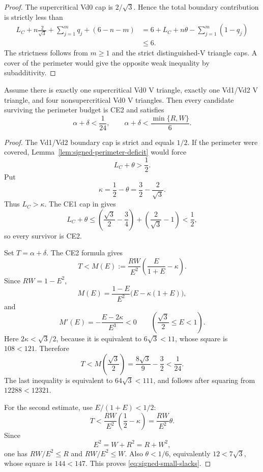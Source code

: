 \begin{proof}
The supercritical Vd0 cap is $2/\sqrt3$. Hence the total boundary contribution
is strictly less than
\[
 \begin{aligned}
 L_C+n\frac2{\sqrt3}+\sum_{j=1}^m q_j+(6-n-m)
 &=6+L_C+n\theta-\sum_{j=1}^m(1-q_j)\\
 &\le6.
 \end{aligned}
\]
The strictness follows from $m\ge1$ and the strict distinguished-V triangle caps. A
cover of the perimeter would give the opposite weak inequality by
subadditivity.
\end{proof}

\begin{lemma}
\label{lem:signed-small-slack}
Assume there is exactly one supercritical Vd0 V triangle, exactly one Vd1/Vd2 V triangle,
and four nonsupercritical Vd0 V triangles. Then every candidate surviving the
perimeter budget is CE2 and satisfies
\begin{equation}
 \boxed{
 \alpha+\delta<\frac1{24},
 \qquad
 \alpha+\delta<\frac{\min\{R,W\}}6.}
 \label{eq:signed-small-slacks}
\end{equation}
\end{lemma}

\begin{proof}
The Vd1/Vd2 boundary cap is strict and equals $1/2$. If the perimeter were
covered, Lemma~\ref{lem:signed-perimeter-deficit} would force
\[
 L_C+\theta>\frac12.
\]
Put
\[
 \kappa=\frac12-\theta=\frac32-\frac2{\sqrt3}.
\]
Thus $L_C>\kappa$. The CE1 cap in
 gives
\[
 L_C+\theta
 \le\left(\frac{\sqrt3}{2}-\frac34\right)
   +\left(\frac2{\sqrt3}-1\right)
 <\frac12,
\]
so every survivor is CE2.

Set $T=\alpha+\delta$. The CE2 formula gives
\[
 T<M(E):=
 \frac{RW}{E^2}\left(\frac{E}{1+E}-\kappa\right).
\]
Since $RW=1-E^2$,
\[
 M(E)=\frac{1-E}{E^2}\bigl(E-\kappa(1+E)\bigr),
\]
and
\[
 M'(E)=-\frac{E-2\kappa}{E^3}<0
 \qquad\left(\frac{\sqrt3}{2}\le E<1\right).
\]
Here $2\kappa<\sqrt3/2$, because it is equivalent to
$6\sqrt3<11$, whose square is $108<121$. Therefore
\[
 T<M\left(\frac{\sqrt3}{2}\right)
 =\frac{8\sqrt3}{9}-\frac32<\frac1{24}.
\]
The last inequality is equivalent to $64\sqrt3<111$, and follows after
squaring from $12288<12321$.

For the second estimate, use $E/(1+E)<1/2$:
\[
 T<\frac{RW}{E^2}\left(\frac12-\kappa\right)
   =\frac{RW}{E^2}\theta.
\]
Since
\[
 E^2=W+R^2=R+W^2,
\]
one has $RW/E^2\le R$ and $RW/E^2\le W$. Also
$\theta<1/6$, equivalently $12<7\sqrt3$, whose square is $144<147$.
This proves \eqref{eq:signed-small-slacks}.
\end{proof}

